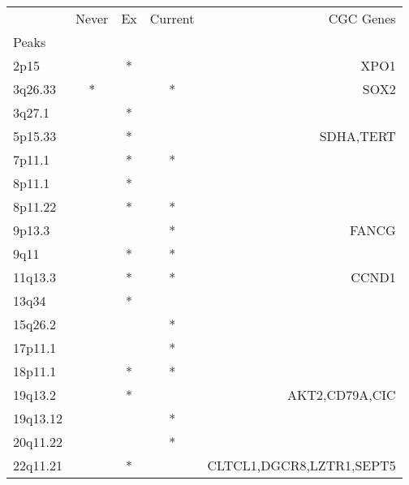 \begin{tabular}{lcccr}
\toprule
{} & Never & Ex & Current &                 CGC Genes \\
Peaks    &       &    &         &                           \\
\midrule
2p15     &       &  * &         &                      XPO1 \\
3q26.33  &     * &    &       * &                      SOX2 \\
3q27.1   &       &  * &         &                           \\
5p15.33  &       &  * &         &                 SDHA,TERT \\
7p11.1   &       &  * &       * &                           \\
8p11.1   &       &  * &         &                           \\
8p11.22  &       &  * &       * &                           \\
9p13.3   &       &    &       * &                     FANCG \\
9q11     &       &  * &       * &                           \\
11q13.3  &       &  * &       * &                     CCND1 \\
13q34    &       &  * &         &                           \\
15q26.2  &       &    &       * &                           \\
17p11.1  &       &    &       * &                           \\
18p11.1  &       &  * &       * &                           \\
19q13.2  &       &  * &         &            AKT2,CD79A,CIC \\
19q13.12 &       &    &       * &                           \\
20q11.22 &       &    &       * &                           \\
22q11.21 &       &  * &         &  CLTCL1,DGCR8,LZTR1,SEPT5 \\
\bottomrule
\end{tabular}
